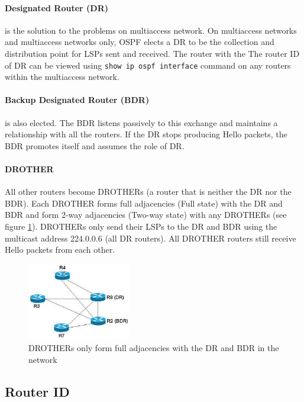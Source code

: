 \paragraph{Designated Router (DR)} is the solution to the problems on multiaccess network. On multiaccess networks and multiaccess networks only, OSPF elects a DR to be the collection and distribution point for LSPs sent and received. The router with the  The router ID of DR can be viewed using \texttt{show ip ospf interface} command on any routers within the multiaccess network.
	
\paragraph{Backup Designated Router (BDR)} is also elected. The BDR listens passively to this exchange and maintains a relationship with all the routers. If the DR stops producing Hello packets, the BDR promotes itself and assumes the role of DR.
	
\paragraph{DROTHER} All other routers become DROTHERs (a router that is neither the DR nor the BDR). Each DROTHER forms full adjacencies (Full state) with the DR and BDR and form 2-way adjacencies (Two-way state) with any DROTHERs (see figure \ref{DR-adjacency}). DROTHERs only send their LSPs to the DR and BDR using the multicast address 224.0.0.6 (all DR routers). All DROTHER routers still receive Hello packets from each other.
	
\begin{figure}[hbtp]
\centering
\includegraphics[width=0.4\textwidth]{pictures/dr-bdr.jpeg}
\caption{DROTHERs only form full adjacencies with the DR and BDR in the network}
\label{DR-adjacency}
\end{figure}

\subsection{Router ID}

